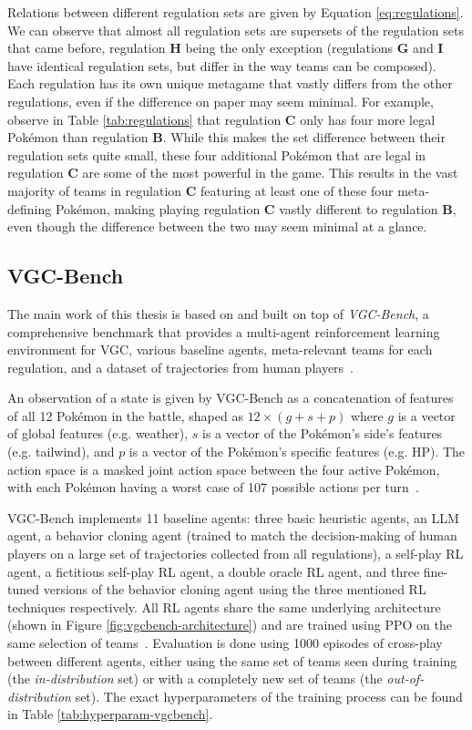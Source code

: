 Relations between different regulation sets are given by Equation \ref{eq:regulations}.
We can observe that almost all regulation sets are supersets of the regulation sets that came before, regulation \textbf{H} being the only exception (regulations \textbf{G} and \textbf{I} have identical regulation sets, but differ in the way teams can be composed).
Each regulation has its own unique metagame that vastly differs from the other regulations, even if the difference on paper may seem minimal.
For example, observe in Table \ref{tab:regulations} that regulation \textbf{C} only has four more legal Pokémon than regulation \textbf{B}.
While this makes the set difference between their regulation sets quite small, these four additional Pokémon that are legal in regulation \textbf{C} are some of the most powerful in the game.
This results in the vast majority of teams in regulation \textbf{C} featuring at least one of these four meta-defining Pokémon, making playing regulation \textbf{C} vastly different to regulation \textbf{B}, even though the difference between the two may seem minimal at a glance.

\subsection{VGC-Bench} \label{sec:vgc:vgc-bench}
The main work of this thesis is based on and built on top of \textit{VGC-Bench}, a comprehensive benchmark that provides a multi-agent reinforcement learning environment for VGC, various baseline agents, meta-relevant teams for each regulation, and a dataset of trajectories from human players~\cite{angliss2025vgc}.

An observation of a state is given by VGC-Bench as a concatenation of features of all 12 Pokémon in the battle, shaped as $12 \times (g + s + p)$ where $g$ is a vector of global features (e.g. weather), $s$ is a vector of the Pokémon's side's features (e.g. tailwind), and $p$ is a vector of the Pokémon's specific features (e.g. HP).
The action space is a masked joint action space between the four active Pokémon, with each Pokémon having a worst case of 107 possible actions per turn~\cite{angliss2025vgc}.

VGC-Bench implements 11 baseline agents: three basic heuristic agents, an LLM agent, a behavior cloning agent (trained to match the decision-making of human players on a large set of trajectories collected from all regulations), a self-play RL agent, a fictitious self-play RL agent, a double oracle RL agent, and three fine-tuned versions of the behavior cloning agent using the three mentioned RL techniques respectively.
All RL agents share the same underlying architecture (shown in Figure \ref{fig:vgcbench-architecture}) and are trained using PPO on the same selection of teams~\cite{angliss2025vgc}.
Evaluation is done using 1000 episodes of cross-play between different agents, either using the same set of teams seen during training (the \textit{in-distribution} set) or with a completely new set of teams (the \textit{out-of-distribution} set).
The exact hyperparameters of the training process can be found in Table \ref{tab:hyperparam-vgcbench}.

